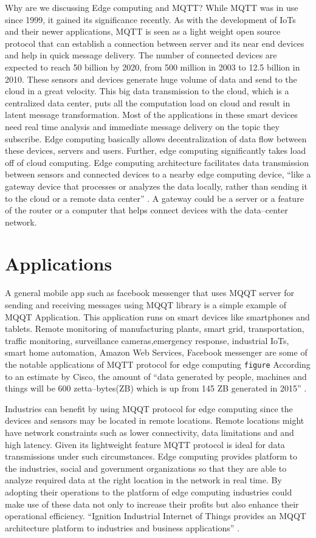 \documentclass[sigconf]{acmart}
\begin{document}
Why are we discussing Edge computing and MQTT? While MQTT was in use since 1999, it gained its significance recently. As with the development of IoTs and their newer applications, MQTT is seen as a light weight open source protocol that can establish a connection between server and its near end devices and help in quick message delivery. The number of connected devices are expected to reach 50 billion by 2020, from 500 million in 2003 to 12.5 billion in 2010. These sensors and devices generate huge volume of data and send to the cloud in a great velocity. This big data transmission to the cloud, which is a centralized data center, puts all the computation load on cloud and result in latent message transformation. Most of the applications in these smart devices need real time analysis and immediate message delivery on the topic they subscribe. Edge computing basically allows decentralization of data flow between these devices, servers and users. Further, edge computing significantly takes load off of cloud computing. Edge computing architecture facilitates data transmission between sensors and connected devices to a nearby edge computing device, ``like a gateway device that processes or analyzes the data locally, rather than sending it to the cloud or a remote data center'' \cite{www-rtinsights-com}. A gateway could be a server or a feature of the router or a computer that helps connect devices with the data--center network.

\section{Applications}
A general mobile app such as facebook messenger that uses MQQT server for sending and receiving messages using MQQT library is a simple example of MQQT Application. This application runs on smart devices like smartphones and tablets.
Remote monitoring of manufacturing plants, smart grid, transportation, traffic monitoring, surveillance cameras,emergency response, industrial IoTs, smart home automation, Amazon Web Services, Facebook messenger are some of the notable  applications of MQTT protocol for edge computing \texttt{figure} According to an estimate by Cisco, the amount of ``data generated by people, machines and things will be 600 zetta--bytes(ZB) which is up from 145 ZB generated in 2015'' \cite{www-rtinsights-com}. 

Industries can benefit by using MQQT protocol for edge computing since the devices and sensors may be located in remote locations. Remote locations might have network constraints such as lower connectivity, data limitations and and high latency. Given its lightweight feature MQTT protocol is ideal for data transmissions under such circumstances. Edge computing provides platform to the industries, social and government organizations so that they are able to analyze required data at the right location in the network in real time. By adopting their operations to the platform of edge computing industries could make use of these data not only to increase their profits but also enhance their operational efficiency. ``Ignition Industrial Internet of Things provides an MQQT architecture platform to industries and business applications'' \cite{inductiveautomation-com}. 
\end{document}
